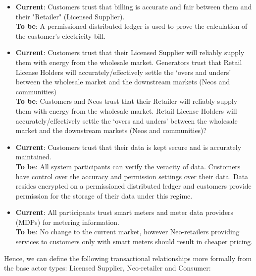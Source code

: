 \documentclass{article}
\theoremstyle{definition}
\theoremstyle{plain} %
\begin{document}
\begin{itemize}
\item{\textbf{Current}: Customers trust that billing is accurate and fair between them and their "Retailer" (Licensed Supplier). \\

\textbf{To be}: A permissioned distributed ledger is used to prove the calculation of the customer’s electricity bill.} \\

\item{\textbf{Current}: Customers trust that their Licensed Supplier will reliably supply them with energy from the wholesale market.  Generators trust that Retail License Holders will accurately/effectively settle the ‘overs and unders’ between the wholesale market and the downstream markets (Neos and communities) \\

\textbf{To be}: Customers and Neos trust that their Retailer will reliably supply them with energy from the wholesale market. Retail License Holders will accurately/effectively settle the ‘overs and unders’ between the wholesale market and the downstream markets (Neos and communities)?} \\

\item{\textbf{Current}: Customers trust that their data is kept secure and is accurately maintained. \\

\textbf{To be}: All system participants can verify the veracity of data. Customers have control over the accuracy and permission settings over their data. Data resides encrypted on a permissioned distributed ledger and customers provide permission for the storage of their data under this regime.} \\

\item{\textbf{Current}: All participants trust smart meters and meter data providers (MDPs) for metering information. \\

\textbf{To be}: No change to the current market, however Neo-retailers providing services to customers only with smart meters should result in cheaper pricing.}
\end{itemize}

\noindent Hence, we can define the following transactional relationships more formally from the base actor types: Licensed Supplier, Neo-retailer and Consumer:
\end{document}
